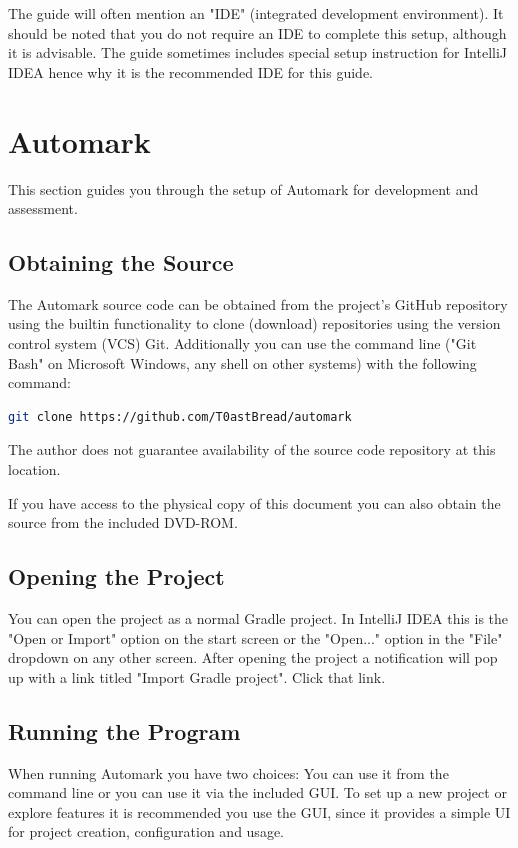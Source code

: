 \documentclass[12pt,a4paper,oneside]{report}
\begin{document}
	The guide will often mention an "IDE" (integrated development environment). It should be noted that you do not require an IDE to complete this setup, although it is advisable. The guide sometimes includes special setup instruction for IntelliJ IDEA\parencite{intellijwebsite} hence why it is the recommended IDE for this guide.

	\section{Automark}
	This section guides you through the setup of Automark for development and assessment.

	\subsection{Obtaining the Source}
	The Automark source code can be obtained from the project's GitHub repository using the builtin functionality to clone (download) repositories using the version control system (VCS) Git. Additionally you can use the command line ("Git Bash" on Microsoft Windows, any shell on other systems) with the following command:
	\begin{lstlisting}[language=sh]
		git clone https://github.com/T0astBread/automark
	\end{lstlisting}
	The author does not guarantee availability of the source code repository at this location.

	If you have access to the physical copy of this document you can also obtain the source from the included DVD-ROM.

	\subsection{Opening the Project}
	You can open the project as a normal Gradle project. In IntelliJ IDEA this is the "Open or Import" option on the start screen or the "Open..." option in the "File" dropdown on any other screen. After opening the project a notification will pop up with a link titled "Import Gradle project". Click that link.

	\subsection{Running the Program}
	When running Automark you have two choices: You can use it from the command line or you can use it via the included GUI. To set up a new project or explore features it is recommended you use the GUI, since it provides a simple UI for project creation, configuration and usage.
\end{document}
